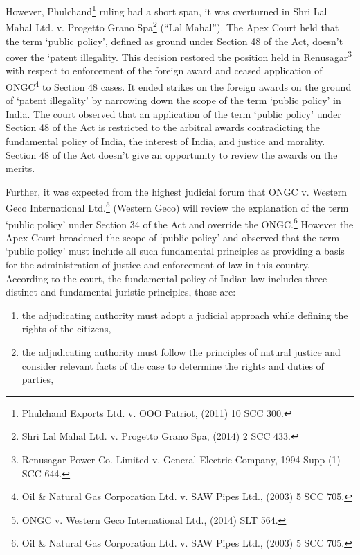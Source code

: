 \begin{multicols}{2}
\vspace{-.1cm}

\noi
However, Phulchand\footnote{Phulchand Exports Ltd. v. OOO Patriot, (2011) 10 SCC 300.} ruling had a short span, it was overturned in Shri Lal Mahal Ltd. v.
Progetto Grano Spa\footnote{Shri Lal Mahal Ltd. v. Progetto Grano Spa, (2014) 2 SCC 433.} (“Lal Mahal”). The Apex Court held that the term ‘public policy’,
defined as ground under Section 48 of the Act, doesn’t cover the ‘patent illegality. This
decision restored the position held in Renusagar\footnote{Renusagar Power Co. Limited v. General Electric Company, 1994 Supp (1) SCC 644.} with respect to enforcement of the foreign
award and ceased application of ONGC\footnote{Oil \& Natural Gas Corporation Ltd. v. SAW Pipes Ltd., (2003) 5 SCC 705.} to Section 48 cases. It ended strikes on the foreign
awards on the ground of ‘patent illegality’ by narrowing down the scope of the term ‘public
policy’ in India. The court observed that an application of the term ‘public policy’ under
Section 48 of the Act is restricted to the arbitral awards contradicting the fundamental policy of India, the interest of India, and justice and morality. Section 48 of the Act doesn’t give an
opportunity to review the awards on the merits.

\vspace{-.1cm}

\noi
Further, it was expected from the highest judicial forum that ONGC v. Western Geco
International Ltd.\footnote{ONGC v. Western Geco International Ltd., (2014) SLT 564.} (Western Geco) will review the explanation of the term ‘public policy’
under Section 34 of the Act and override the ONGC.\footnote{Oil \& Natural Gas Corporation Ltd. v. SAW Pipes Ltd., (2003) 5 SCC 705.} However the Apex Court broadened
the scope of ‘public policy’ and observed that the term ‘public policy’ must include all such
fundamental principles as providing a basis for the administration of justice and enforcement
of law in this country. According to the court, the fundamental policy of Indian law includes
three distinct and fundamental juristic principles, those are:

\vspace{-.2cm}

\begin{enumerate}[label=$\alph*)$]
\itemsep=0pt
\item the adjudicating authority must adopt a judicial approach while defining the rights of the citizens,

\item the adjudicating authority must follow the principles of natural justice and consider relevant facts of the case to determine the rights and duties of parties,


\end{enumerate}
\end{multicols}
